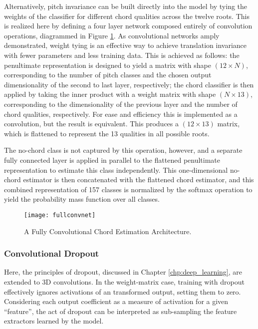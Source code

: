 Alternatively, pitch invariance can be built directly into the model by tying the weights of the classifier for different chord qualities across the twelve roots.
This is realized here by defining a four layer network composed entirely of convolution operations, diagrammed in Figure \ref{fig:fullconvnet}.
As convolutional networks amply demonstrated, weight tying is an effective way to achieve translation invariance with fewer parameters and less training data.
This is achieved as follows: the penultimate representation is designed to yield a matrix with shape $(12 \times N)$, corresponding to the number of pitch classes and the chosen output dimensionality of the second to last layer, respectively; the chord classifier is then applied by taking the inner product with a weight matrix with shape $(N \times 13)$, corresponding to the dimensionality of the previous layer and the number of chord qualities, respectively.
For ease and efficiency this is implemented as a convolution, but the result is equivalent.
This produces a $(12 \times 13)$ matrix, which is flattened to represent the 13 qualities in all possible roots.

The no-chord class is not captured by this operation, however, and a separate fully connected layer is applied in parallel to the flattened penultimate representation to estimate this class independently.
This one-dimensional no-chord estimator is then concatenated with the flattened chord estimator, and this combined representation of 157 classes is normalized by the softmax operation to yield the probability mass function over all classes.

\begin{figure}[!t]
\centering
\texttt{[image: fullconvnet]}
\caption{A Fully Convolutional Chord Estimation Architecture.}
\label{fig:fullconvnet}
\end{figure}

\subsubsection{Convolutional Dropout}
\label{subsubsec:conv_dropout}

Here, the principles of dropout, discussed in Chapter \ref{chp:deep_learning}, are extended to 3D convolutions.
In the weight-matrix case, training with dropout effectively ignores activations of an transformed output, setting them to zero.
Considering each output coefficient as a measure of activation for a given ``feature'', the act of dropout can be interpreted as sub-sampling the feature extractors learned by the model.

